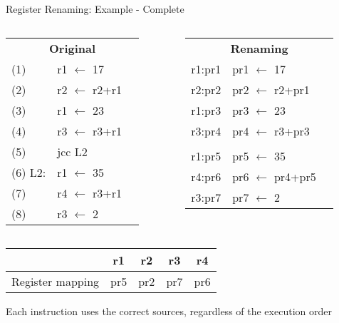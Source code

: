 \documentclass[aspectratio=169,12pt]{beamer}
\begin{document}
\begin{frame}{Register Renaming: Example - Complete}
  \begin{columns}
    \begin{column}{0.5\textwidth}
      \begin{tabular}{lll}
        \multicolumn{3}{c}{\textbf{Original}} \\
        (1) & r1 $\leftarrow$ 17 & \\
        (2) & r2 $\leftarrow$ r2+r1 & \\
        (3) & r1 $\leftarrow$ 23 & \\
        (4) & r3 $\leftarrow$ r3+r1 & \\
        (5) & jcc L2 & \\
        (6) L2: & r1 $\leftarrow$ 35 & \\
        (7) & r4 $\leftarrow$ r3+r1 & \\
        (8) & r3 $\leftarrow$ 2 & \\
      \end{tabular}
    \end{column}

    \begin{column}{0.5\textwidth}
      \begin{tabular}{lll}
        \multicolumn{3}{c}{\textbf{Renaming}} \\
        r1:pr1 & pr1 $\leftarrow$ 17 & \\
        r2:pr2 & pr2 $\leftarrow$ r2+pr1 & \\
        r1:pr3 & pr3 $\leftarrow$ 23 & \\
        r3:pr4 & pr4 $\leftarrow$ r3+pr3 & \\
        & & \\
        r1:pr5 & pr5 $\leftarrow$ 35 & \\
        r4:pr6 & pr6 $\leftarrow$ pr4+pr5 & \\
        r3:pr7 & pr7 $\leftarrow$ 2 & \\
      \end{tabular}
    \end{column}
  \end{columns}

  \vspace{0.5cm}
  \begin{center}
    \begin{tabular}{|c|c|c|c|c|}
      \hline
      & r1 & r2 & r3 & r4 \\
      \hline
      Register mapping & pr5 & pr2 & pr7 & pr6 \\
      \hline
    \end{tabular}
  \end{center}

  \begin{center}
    \colorbox{green!30}{Each instruction uses the correct sources, regardless of the execution order}
  \end{center}
\end{frame}
\end{document}
